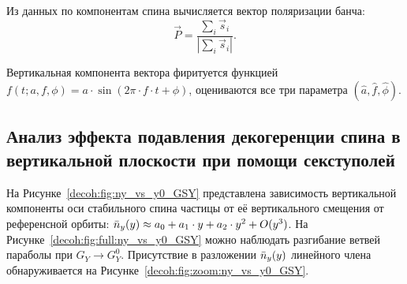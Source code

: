 Из данных по компонентам спина вычисляется вектор поляризации банча:
\begin{equation}\label{eq:polarization_formula}
\vec P = \frac{\sum_i\vec s_i}{|\sum_i\vec s_i|}.
\end{equation}

Вертикальная компонента вектора фиритуется функцией $f(t; a,f,\phi) = a\cdot \sin(2\pi\cdot
f\cdot t + \phi)$, оцениваются все три параметра $(\hat a, \hat f,
\hat\phi)$. 

\subsection{Анализ эффекта подавления декогеренции спина в вертикальной плоскости при помощи секступолей}
На Рисунке~\ref{decoh:fig:ny_vs_y0_GSY} представлена зависимость вертикальной компоненты оси стабильного спина частицы от её вертикального смещения от референсной орбиты: $\bar n_y(y)\approx a_0 + a_1\cdot y + a_2\cdot y^2 + O(y^3)$. На Рисунке~\ref{decoh:fig:full:ny_vs_y0_GSY} можно наблюдать разгибание ветвей параболы при $G_Y \rightarrow G_Y^0$. Присутствие в разложении $\bar n_y(y)$ линейного члена обнаруживается на 
Рисунке~\ref{decoh:fig:zoom:ny_vs_y0_GSY}.


